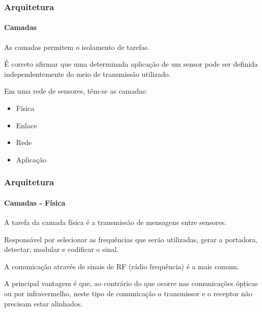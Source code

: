 \documentclass[notes]{beamer}
\begin{document}
\begin{frame}
\label{slide_38}
\frametitle{Arquitetura}
\framesubtitle{Camadas}

\begin{block}

As camadas permitem o isolamento de tarefas.

\end{block} \pause

\begin{block}

É correto afirmar que uma determinada aplicação de um sensor pode ser definida independentemente do meio de transmissão utilizado.

\end{block} \pause

\begin{block}

Em uma rede de sensores, têm-se as camadas: \pause

\begin{itemize}

\item Física \pause
\item Enlace \pause
\item Rede \pause
\item Aplicação

\end{itemize}

\end{block}

\end{frame}

\begin{frame}
\label{slide_39}
\frametitle{Arquitetura}
\framesubtitle{Camadas - Física}

\begin{block}

A tarefa da camada física é a transmissão de mensagens entre sensores.

\end{block} \pause

\begin{block}

Responsável por selecionar as frequências que serão utilizadas, gerar a portadora, detectar, modular e codificar o sinal. 

\end{block} \pause

\begin{block}

A comunicação através de sinais de RF (rádio frequência) é a mais comum. 
\end{block} \pause

\begin{block}

A principal vantagem é que, ao contrário do que ocorre nas comunicações ópticas ou por infravermelho, neste tipo de comunicação o transmissor e o receptor não precisam estar alinhados.

\end{block}

\end{frame}
\end{document}
